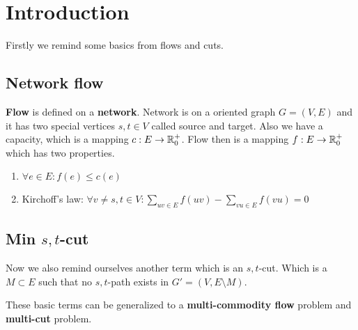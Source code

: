 \chapter{Introduction}

Firstly we remind some basics from flows and cuts. 

\section{Network flow}

\textbf{Flow} is defined on a \textbf{network}. Network is on a oriented graph $G = (V,E)$ and it has two special vertices $s,t \in V$ called source and target. Also we have a capacity, which is a mapping $c : E \to \mathbb{R}_{0}^{+}$. Flow then is a mapping $f : E \to \mathbb{R}_{0}^{+}$ which has two properties.

\begin{enumerate}
	\item $\forall e \in E: f(e) \leq c(e)$
	\item Kirchoff's law: $\forall v \neq s, t \in V: \sum_{uv \in E} f(uv) - \sum_{vu \in E} f(vu) = 0$
\end{enumerate}

\section{Min $s,t$-cut}

Now we also remind ourselves another term which is an $s,t$-cut. Which is a $M \subset E$ such that no $s,t$-path exists in $G' = (V, E \setminus M)$.

These basic terms can be generalized to a \textbf{multi-commodity flow} problem and \textbf{multi-cut} problem.